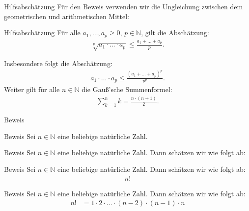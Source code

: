 \documentclass[10pt]{beamer}
\def\bN{\mathbb{N}}
\begin{document}
\begin{frame}{Hilfsabschätzung}
    Für den Beweis verwenden wir die Ungleichung zwischen dem geometrischen und arithmetischen Mittel:
    \begin{block}{Hilfsabschätzung}
        Für alle \( a_{1}, \ldots, a_{p} \geq 0 \), \( p \in \bN \), gilt die Abschätzung:
        \begin{align*}
            \sqrt[p]{a_{1} \cdot \ldots \cdot a_{p}} 
            \leq \frac{a_{1} + \ldots + a_{p}}{p}.
        \end{align*}
    \end{block}
    Insbesondere folgt die Abschätzung:
    \begin{align*}
        a_{1} \cdot \ldots \cdot a_{p} 
        \leq \frac{\left( a_{1} + \ldots + a_{p} \right)^{p}}{p^{p}}.
    \end{align*}
    Weiter gilt für alle \( n \in \bN \) die Gauß'sche Summenformel:
    \begin{align*}
        \sum_{k = 1}^{n} k
        = \frac{n \cdot \left( n + 1 \right)}{2}.
    \end{align*}
\end{frame}



\begin{frame}{Beweis}
    
\end{frame}



\begin{frame}{Beweis}
    Sei \( n \in \bN \) eine beliebige natürliche Zahl.
\end{frame}



\begin{frame}{Beweis}
    Sei \( n \in \bN \) eine beliebige natürliche Zahl. Dann schätzen wir wie folgt ab:
\end{frame}



\begin{frame}{Beweis}
    Sei \( n \in \bN \) eine beliebige natürliche Zahl. Dann schätzen wir wie folgt ab:
    \begin{align*}
        n!
    \end{align*}
\end{frame}



\begin{frame}{Beweis}
    Sei \( n \in \bN \) eine beliebige natürliche Zahl. Dann schätzen wir wie folgt ab:
    \begin{align*}
        n!
        & = 1 \cdot 2 \cdot \ldots \cdot \left( n - 2 \right) \cdot \left( n - 1 \right) \cdot n
    \end{align*}
\end{frame}
\end{document}

